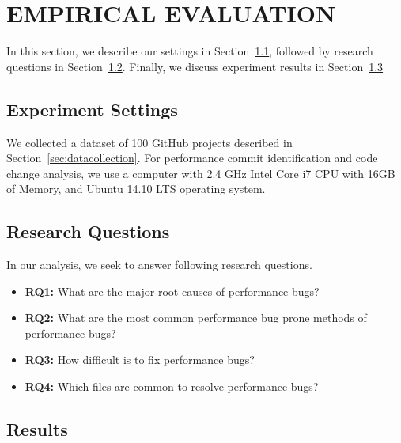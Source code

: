 \chapter{EMPIRICAL EVALUATION}
\label{chapter:empevaluation}
In this section, we describe our settings in Section~\ref{sec:settings}, followed by research questions in Section~\ref{sec:rqs}. Finally, we discuss experiment results in Section~\ref{sec:results}

\section{Experiment Settings}
\label{sec:settings}
We collected a dataset of 100 GitHub projects described in Section~\ref{sec:datacollection}. For performance commit identification and code change analysis, we use a computer with 2.4 GHz Intel Core i7 CPU with 16GB of Memory, and Ubuntu 14.10 LTS operating system. 

\section{Research Questions}
\label{sec:rqs}
In our analysis, we seek to answer following research questions. 

\begin{itemize}
	\item \textbf{RQ1:} What are the major root causes of \unity performance bugs?
	
	\item \textbf{RQ2:} What are the most common performance bug prone methods of \unity performance bugs?
	
	\item \textbf{RQ3:} How difficult is to fix \unity performance bugs?
	
	\item \textbf{RQ4:} Which files are common to resolve \unity performance bugs?
\end{itemize}


\section{Results}
\label{sec:results}

